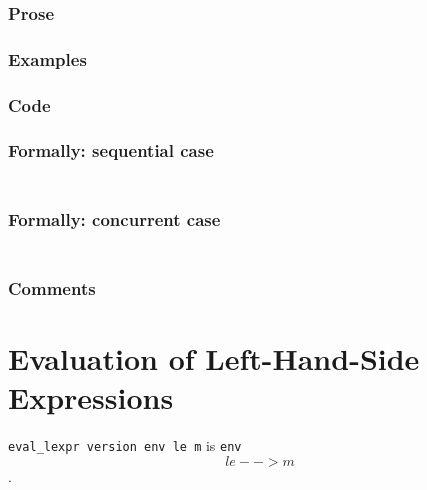 \documentclass{book}
\begin{document}
  \subsubsection{Prose}

  \subsubsection{Examples}

  \subsubsection{Code}

  \subsubsection{Formally: sequential case}
  \begin{align}
  \end{align} 

  \subsubsection{Formally: concurrent case}
  \begin{align}
  \end{align} 

  \subsubsection{Comments}

\section{Evaluation of Left-Hand-Side Expressions}

\texttt{eval\_lexpr version env le m} is \texttt{env\[le --> m\]}.
\end{document}
